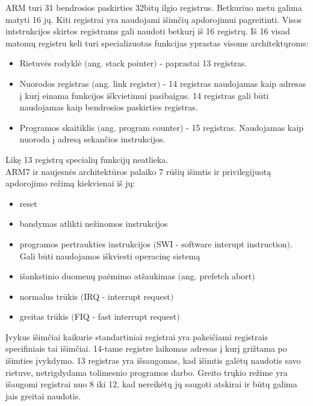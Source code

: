 \documentclass[a4paper, 12pt]{article} %
\begin{document}
\begin{onehalfspacing}
\indent ARM turi 31 bendrosios paskirties 32bit\k{u} ilgio registrus. Betkuriuo metu galima matyti 16 j\k{u}. Kiti registrai yra naudojami i\v{s}im\v{c}i\k{u} apdorojimui pagreitinti. Visos intstrukcijos skirtos registrams gali naudoti betkur\k{i} i\v{s} 16 registr\k{u}. I\v{s} 16 visad matom\k{u} registru keli turi specializuotas funkcijas yprastas visoms architekt\k{u}roms:
\begin{itemize}
\item Rietuv\.{e}s rodykl\.{e} $($ang. stack pointer$)$ - paprastai 13 registras.
\item Nuorodos registras $($ang. link register$)$ - 14 registras naudojamas kaip adresas \k{i} kur\k{i} einama funkcijos i\v{s}kvietimui pasibaigus. 14 registras gali b\={u}ti naudojamas kaip bendrosios paskirties registras.
\item Programos skaitiklis $($ang. program counter$)$ - 15 registras. Naudojamas kaip nuoroda \k{i} adres\k{a} sekan\v{c}ios instrukcijos. 
\end{itemize}
Lik\k{e} 13 registr\k{u} speciali\k{u} funkcij\k{u} neatlieka. \\
\indent ARM7 ir naujesn\.{e}s architekt\={u}ros palaiko 7 r\={u}\v{s}i\k{u} i\v{s}imtis ir privilegijuot\k{a} apdorojimo re\v{z}im\k{a} kiekvienai i\v{s} j\k{u}:
\begin{itemize}
\item reset
\item bandymas atlikti ne\v{z}inomos instrukcijos
\item programos pertraukties instrukcijos $($SWI - software interupt instruction$)$. Gali b\={u}ti naudojamos i\v{s}kviesti operacin\k{e} sistem\k{a}
\item i\v{s}ankstinio duomen\k{u} pa\.{e}mimo at\v{s}aukimas $($ang. prefetch abort$)$
\item normalus tr\={u}kis $($IRQ - interrupt request$)$
\item greitas tr\={u}kis $($FIQ - fast interrupt request$)$
\end{itemize}
\k{I}vykus i\v{s}im\v{c}iai kaikurie standartiniai registrai yra pakei\v{c}iami registrais specifiniais tai i\v{s}im\v{c}iai. 14-tame registre laikomas adresas \k{i} kur\k{i} gri\v{z}tama po i\v{s}imties \k{i}vykdymo. 13 registras yra i\v{s}saugomas, kad i\v{s}imtis gal\.{e}t\k{u} naudotis savo rietuve, netrigdydama tolimesnio programos darbo. Greito tr\k{u}kio re\v{z}ime yra i\v{s}augomi registrai nuo 8 iki 12, kad nereik\.{e}t\k{u} j\k{u} saugoti atskirai ir b\={u}t\k{u} galima jais greitai naudotis. \\

\end{onehalfspacing}
\end{document}
